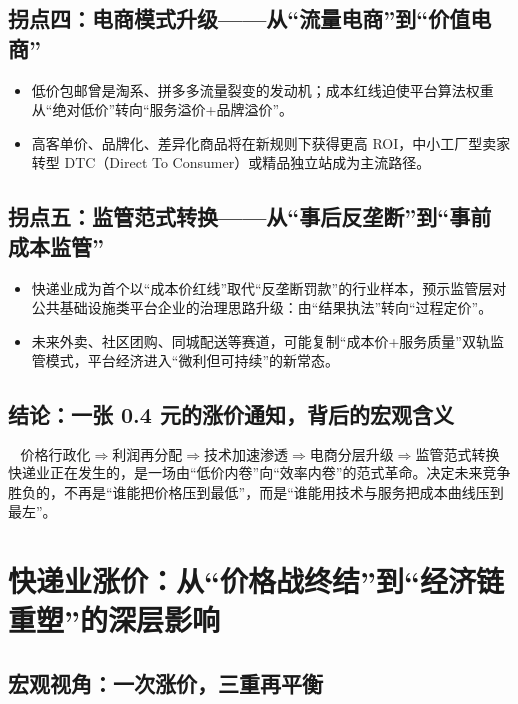\subsection{拐点四：电商模式升级——从“流量电商”到“价值电商”}
\begin{itemize}[leftmargin=*, nosep]
    \item 低价包邮曾是淘系、拼多多流量裂变的发动机；成本红线迫使平台算法权重从“绝对低价”转向“服务溢价+品牌溢价”。
    \item 高客单价、品牌化、差异化商品将在新规则下获得更高 ROI，中小工厂型卖家转型 DTC（Direct To Consumer）或精品独立站成为主流路径。
\end{itemize}

\subsection{拐点五：监管范式转换——从“事后反垄断”到“事前成本监管”}
\begin{itemize}[leftmargin=*, nosep]
    \item 快递业成为首个以“成本价红线”取代“反垄断罚款”的行业样本，预示监管层对公共基础设施类平台企业的治理思路升级：由“结果执法”转向“过程定价”。
    \item 未来外卖、社区团购、同城配送等赛道，可能复制“成本价+服务质量”双轨监管模式，平台经济进入“微利但可持续”的新常态。
\end{itemize}

\subsection{结论：一张 0.4 元的涨价通知，背后的宏观含义}
\[
\text{价格行政化} \Rightarrow \text{利润再分配} \Rightarrow \text{技术加速渗透} \Rightarrow \text{电商分层升级} \Rightarrow \text{监管范式转换}
\]
快递业正在发生的，是一场由“低价内卷”向“效率内卷”的范式革命。决定未来竞争胜负的，不再是“谁能把价格压到最低”，而是“谁能用技术与服务把成本曲线压到最左”。



\section{快递业涨价：从“价格战终结”到“经济链重塑”的深层影响}
\subsection{宏观视角：一次涨价，三重再平衡}
